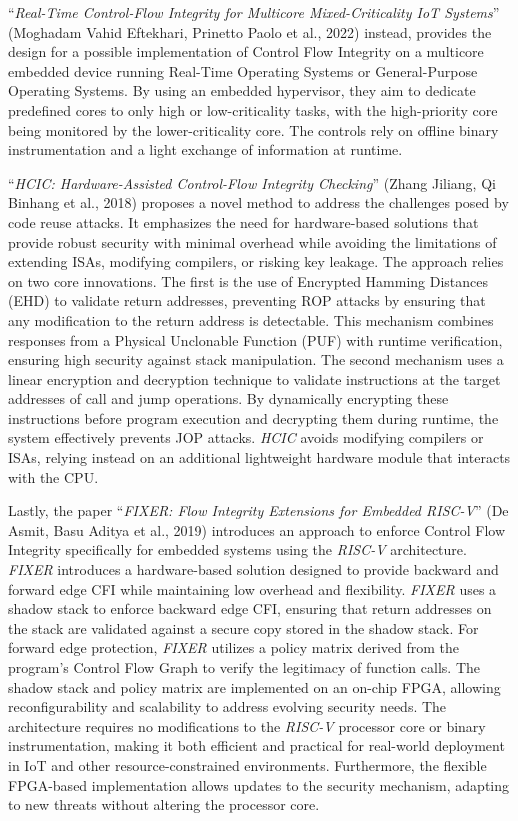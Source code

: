 ``\textit{Real-Time Control-Flow Integrity for Multicore Mixed-Criticality IoT
Systems}'' (Moghadam Vahid Eftekhari, Prinetto Paolo et al., 2022)\cite{multicorecfi}
instead, provides the design for a possible implementation of Control Flow Integrity
on a multicore embedded device running Real-Time Operating Systems or General-Purpose
Operating Systems. By using an embedded hypervisor, they aim to dedicate predefined
cores to only high or low-criticality tasks, with the high-priority core being
monitored by the lower-criticality core. The controls rely on offline binary instrumentation
and a light exchange of information at runtime.

``\textit{HCIC: Hardware-Assisted Control-Flow Integrity Checking}'' (Zhang Jiliang,
Qi Binhang et al., 2018)\cite{HCIC} proposes a novel method to address the
challenges posed by code reuse attacks. It emphasizes the need for hardware-based
solutions that provide robust security with minimal overhead while avoiding the limitations
of extending ISAs, modifying compilers, or risking key leakage. The approach
relies on two core innovations. The first is the use of Encrypted Hamming Distances
(EHD) to validate return addresses, preventing ROP attacks by ensuring that any
modification to the return address is detectable. This mechanism combines responses
from a Physical Unclonable Function (PUF) with runtime verification, ensuring
high security against stack manipulation. The second mechanism uses a linear encryption
and decryption technique to validate instructions at the target addresses of call
and jump operations. By dynamically encrypting these instructions before program
execution and decrypting them during runtime, the system effectively prevents JOP
attacks. \textit{HCIC} avoids modifying compilers or ISAs, relying instead on an
additional lightweight hardware module that interacts with the CPU.

Lastly, the paper ``\textit{FIXER: Flow Integrity Extensions for Embedded RISC-V}''
(De Asmit, Basu Aditya et al., 2019)\cite{Fixer} introduces an approach to
enforce Control Flow Integrity specifically for embedded systems using the
\textit{RISC-V} architecture. \textit{FIXER} introduces a hardware-based solution
designed to provide backward and forward edge CFI while maintaining low overhead
and flexibility. \textit{FIXER} uses a shadow stack to enforce backward edge CFI,
ensuring that return addresses on the stack are validated against a secure copy
stored in the shadow stack. For forward edge protection, \textit{FIXER} utilizes
a policy matrix derived from the program's Control Flow Graph to verify the legitimacy
of function calls. The shadow stack and policy matrix are implemented on an on-chip
FPGA, allowing reconfigurability and scalability to address evolving security needs.
The architecture requires no modifications to the \textit{RISC-V} processor core
or binary instrumentation, making it both efficient and practical for real-world
deployment in IoT and other resource-constrained environments. Furthermore, the
flexible FPGA-based implementation allows updates to the security mechanism, adapting
to new threats without altering the processor core.

